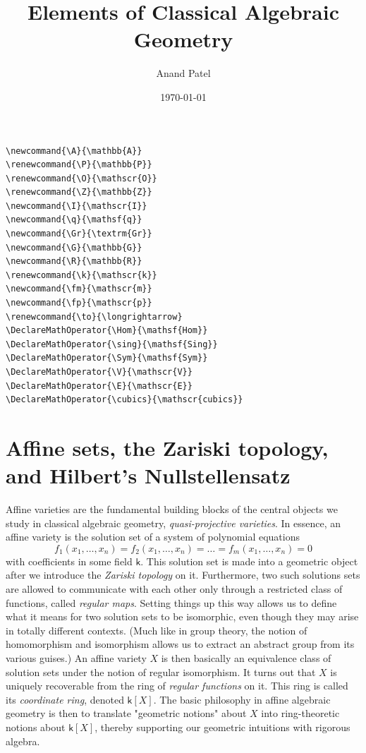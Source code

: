 \documentclass[11pt]{article}
\author{Anand Patel}
\date{\today}
\title{Elements of Classical Algebraic Geometry}
\newcommand{\A}{\mathbb A}
\renewcommand{\k}{\mathsf{k}}
\renewcommand{\P}{\mathbb P}
\newcommand{\G}{\mathbb G}
\DeclareMathOperator{\Gr}{Gr}
\renewcommand{\to}{{\longrightarrow}}
\begin{document}
\maketitle
\begin{verbatim}
\newcommand{\A}{\mathbb{A}}
\renewcommand{\P}{\mathbb{P}}
\renewcommand{\O}{\mathscr{O}}
\renewcommand{\Z}{\mathbb{Z}}
\newcommand{\I}{\mathscr{I}}
\newcommand{\q}{\mathsf{q}}
\newcommand{\Gr}{\textrm{Gr}}
\newcommand{\G}{\mathbb{G}}
\newcommand{\R}{\mathbb{R}}
\renewcommand{\k}{\mathscr{k}}
\newcommand{\fm}{\mathscr{m}}
\newcommand{\fp}{\mathscr{p}}
\renewcommand{\to}{\longrightarrow}
\DeclareMathOperator{\Hom}{\mathsf{Hom}}
\DeclareMathOperator{\sing}{\mathsf{Sing}}
\DeclareMathOperator{\Sym}{\mathsf{Sym}}
\DeclareMathOperator{\V}{\mathscr{V}}
\DeclareMathOperator{\E}{\mathscr{E}}
\DeclareMathOperator{\cubics}{\mathscr{cubics}}
\end{verbatim}

\section{Affine sets, the Zariski topology, and Hilbert's Nullstellensatz}
\label{sec-1}


Affine varieties are the fundamental building blocks of the central objects we study in classical algebraic geometry, \emph{quasi-projective varieties}.  In essence, an affine variety is the  solution set of a system of polynomial equations $$f_1(x_1, \dots, x_n) = f_2(x_1, \dots, x_n) = \dots =f_{m}(x_1, \dots, x_n) = 0$$ with coefficients in some field $\k$. This solution set is made into a geometric object after we introduce  the \emph{Zariski topology} on it.  Furthermore, two such solutions sets are allowed to communicate with each other only through a restricted class of functions, called \emph{regular maps}.  Setting things up this way allows us to define what it means for two solution sets to be isomorphic, even though they may arise in totally different contexts.  (Much like in group theory, the notion of homomorphism and isomorphism allows us to extract an abstract group from its  various guises.)  An affine variety $X$ is then basically an equivalence class of solution sets under the notion of regular isomorphism.  It turns out that $X$ is uniquely recoverable from the ring of \emph{regular functions} on it.  This ring is called its  \emph{coordinate ring}, denoted $\k[X]$.  The basic philosophy in affine algebraic geometry is then to translate "geometric notions" about $X$ into ring-theoretic notions about $\k[X]$, thereby supporting our geometric intuitions with rigorous algebra.
\end{document}
